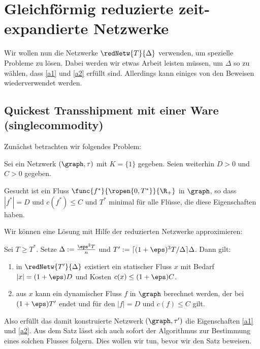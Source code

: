 \section{Gleichförmig reduzierte zeit-expandierte Netzwerke}\label{sec:unif_cond}
Wir wollen nun die Netzwerke $\redNetw{T}{\Delta}$ verwenden, um spezielle
Probleme zu lösen. Dabei werden wir etwas Arbeit leisten müssen, um
$\Delta$ so zu wählen, dass \ref{a1} und \ref{a2} erfüllt sind.
Allerdings kann einiges von den Beweisen wiederverwendet werden.

\subsection{Quickest Transshipment mit einer Ware (singlecommodity)}
Zunächst betrachten wir folgendes Problem:

\begin{problem}
\label{prob:qtp_single}
    Sei ein Netzwerk $(\graph, \tau)$ mit $K=\{1\}$ gegeben.
    Seien weiterhin $D > 0$ und $C > 0$ gegeben.
    
    Gesucht ist ein Fluss $\func{f^*}{\ropen{0,T^*}}{\R_+}$ in $\graph$,
    so dass $|f^*| = D$ und $c(f^*) \leq C$ und $T^*$ minimal für alle Flüsse,
    die diese Eigenschaften haben.
\end{problem}

Wir können eine Lösung mit Hilfe der reduzierten Netzwerke approximieren:

\begin{theorem}\label{theo:qtp_flow_ex}
    Sei $T \geq T^*$. Setze $\Delta := \frac{\eps^2 T}{n}$ und
    $T' := \lceil (1+\eps)^3 T / \Delta \rceil \Delta$.
    Dann gilt:
    \begin{enumerate}[label={\alph*)}]
        \item in $\redNetw{T'}{\Delta}$ existiert ein statischer Fluss $x$ mit
            Bedarf $|x| = (1 + \eps)D$ und Kosten $c(x) \leq (1+\eps)C$.
        \item aus $x$ kann ein dynamischer Fluss $f$ in $\graph$ berechnet werden,
            der bei $(1+\eps)T'$ endet und für den $|f| = D$ und $c(f) \leq C$
            gilt.
    \end{enumerate}
\end{theorem}

Also erfüllt das damit konstruierte Netzwerk $(\graph, \tau')$ die Eigenschaften
\ref{a1} und \ref{a2}. Aus dem Satz lässt sich auch sofort der Algorithmus
zur Bestimmung eines solchen Flusses folgern. Dies wollen wir tun,
bevor wir den Satz beweisen.

